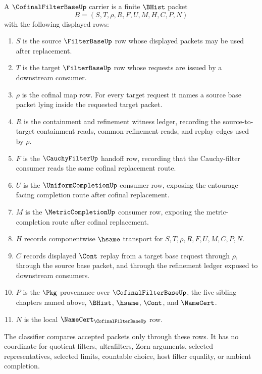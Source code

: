\begin{definition}
\label{def:cofinal-filter-base-carrier}
A $\CofinalFilterBaseUp$ carrier is a finite $\BHist$ packet
$$
B=(S,T,\rho,R,F,U,M,H,C,P,N)
$$
with the following displayed rows:
\begin{enumerate}
\item $S$ is the source $\FilterBaseUp$ row whose displayed packets may be used after replacement.
\item $T$ is the target $\FilterBaseUp$ row whose requests are issued by a downstream consumer.
\item $\rho$ is the cofinal map row. For every target request it names a source base packet lying inside the requested target packet.
\item $R$ is the containment and refinement witness ledger, recording the source-to-target containment reads, common-refinement reads, and replay edges used by $\rho$.
\item $F$ is the $\CauchyFilterUp$ handoff row, recording that the Cauchy-filter consumer reads the same cofinal replacement route.
\item $U$ is the $\UniformCompletionUp$ consumer row, exposing the entourage-facing completion route after cofinal replacement.
\item $M$ is the $\MetricCompletionUp$ consumer row, exposing the metric-completion route after cofinal replacement.
\item $H$ records componentwise $\hsame$ transport for $S,T,\rho,R,F,U,M,C,P,N$.
\item $C$ records displayed $\Cont$ replay from a target base request through $\rho$, through the source base packet, and through the refinement ledger exposed to downstream consumers.
\item $P$ is the $\Pkg$ provenance over $\CofinalFilterBaseUp$, the five sibling chapters named above, $\BHist$, $\hsame$, $\Cont$, and $\NameCert$.
\item $N$ is the local $\NameCert_{\CofinalFilterBaseUp}$ row.
\end{enumerate}
The classifier compares accepted packets only through these rows. It has no coordinate for quotient filters, ultrafilters, Zorn arguments, selected representatives, selected limits, countable choice, host filter equality, or ambient completion.
\end{definition}

